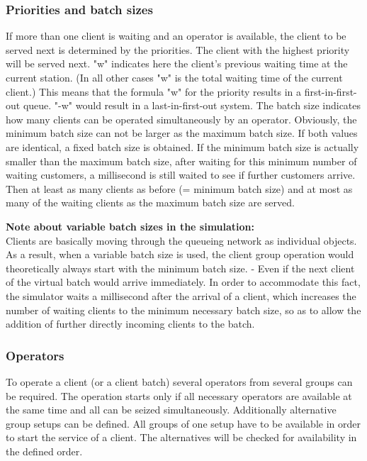 \subsubsection*{Priorities and batch sizes}

If more than one client is waiting and an operator is available, the client to be served next is determined by the 
priorities. The client with the highest priority will be served next. 
"w" indicates here the client's previous waiting time at the current station. (In all other cases "w" is the total
waiting time of the current client.) This means that the formula "w" for the priority results
in a first-in-first-out queue. "-w" would result in a last-in-first-out system.
The batch size indicates how many clients can be operated simultaneously by an operator. Obviously, the minimum batch
size can not be larger as the maximum batch size. If both values are identical, a fixed batch size is obtained.
If the minimum batch size is actually smaller than the maximum batch size, after waiting for this minimum number of
waiting customers, a millisecond is still waited to see if further customers arrive. Then at least as many clients
as before (= minimum batch size) and at most as many of the waiting clients as the maximum batch size are served.

\textbf{Note about variable batch sizes in the simulation:}~\\
Clients are basically moving through the queueing network as individual objects.
As a result, when a variable batch size is used, the client group operation would theoretically always
start with the minimum batch size. - Even if the next client of the virtual batch would arrive immediately.
In order to accommodate this fact, the simulator waits a millisecond after the arrival of a client, which
increases the number of waiting clients to the minimum necessary batch size, so as to allow the addition
of further directly incoming clients to the batch.

\subsubsection*{Operators}

To operate a client (or a client batch) several operators from several groups can be required.
The operation starts only if all necessary operators are available at the same time and all can be seized
simultaneously.
Additionally alternative group setups can be defined. All groups of one setup have to be available in order
to start the service of a client. The alternatives will be checked for availability in the defined order.

